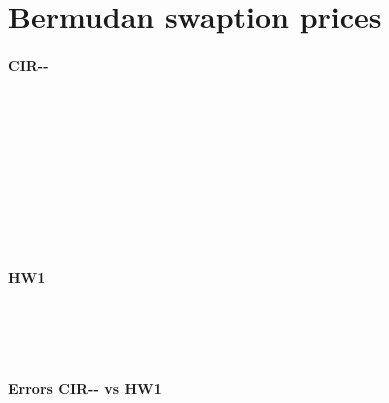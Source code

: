 \section{Bermudan swaption prices}
\paragraph*{CIR-{}-}\hfill\\
\noindent
	
\begin{table}
\centering
	\bSwaptionBOne\hfill\\
\caption{\bSwaptionCaptionBOne}
\end{table}
\begin{table}
\centering
	\bSwaptionBTwo\hfill\\
\caption{\bSwaptionCaptionBTwo}
\end{table}
\begin{table}
\centering
	\bSwaptionBThree\hfill\\
\caption{\bSwaptionCaptionBThree}
\end{table}
\begin{table}
\centering
	\bSwaptionBFour\hfill\\
\caption{\bSwaptionCaptionBFour}
\end{table}
\FloatBarrier
\paragraph*{HW1}\hfill\\
\noindent
	
\begin{table}
\centering
	\bSwaptionHWB\hfill\\
\caption{\bSwaptionHWCaptionB}
\end{table}
\FloatBarrier
\paragraph*{Errors CIR-{}- vs HW1}\hfill\\
\noindent
	
\begin{table}
\centering
	\bSwaptionErrBOne\hfill\\
\caption{\bSwaptionErrCaptionBOne}
\end{table}
\begin{table}
\centering
	\bSwaptionErrBTwo\hfill\\
\caption{\bSwaptionErrCaptionBTwo}
\end{table}
\begin{table}
\centering
	\bSwaptionErrBThree\hfill\\
\caption{\bSwaptionErrCaptionBThree}
\end{table}
\begin{table}
\centering
	\bSwaptionErrBFour\hfill\\
\caption{\bSwaptionErrCaptionBFour}
\end{table}
\FloatBarrier
